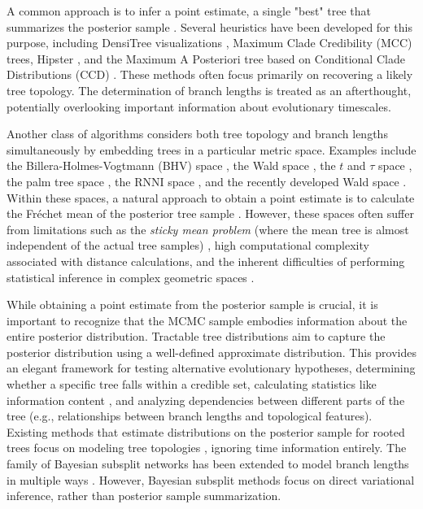 \documentclass[10pt,letterpaper]{article}
\begin{document}
A common approach is to infer a point estimate, a single "best" tree that summarizes the posterior sample \cite{treesinforest}. Several heuristics have been developed for this purpose, including DensiTree visualizations \cite{densitree}, Maximum Clade Credibility (MCC) trees, Hipster \cite{hipstr}, and the Maximum A Posteriori tree based on Conditional Clade Distributions (CCD) \cite{ccd,ccdlarget}. These methods often focus primarily on recovering a likely tree topology. The determination of branch lengths is treated as an afterthought, potentially overlooking important information about evolutionary timescales.

Another class of algorithms considers both tree topology and branch lengths simultaneously by embedding trees in a particular metric space. Examples include the Billera-Holmes-Vogtmann (BHV) space \cite{bhv}, the Wald space \cite{wald}, the $t$ and $\tau$ space \cite{tauspace}, the palm tree space \cite{tropical}, the RNNI space \cite{rnnispace}, and the recently developed Wald space \cite{wald}. Within these spaces, a natural approach to obtain a point estimate is to calculate the Fréchet mean of the posterior tree sample \cite{frechetmeanvar}. However, these spaces often suffer from limitations such as the \emph{sticky mean problem} (where the mean tree is almost independent of the actual tree samples) \cite{sticky}, high computational complexity associated with distance calculations, and the inherent difficulties of performing statistical inference in complex geometric spaces \cite{riemanngaussian}.

While obtaining a point estimate from the posterior sample is crucial, it is important to recognize that the MCMC sample embodies information about the entire posterior distribution. Tractable tree distributions \cite{ccd} aim to capture the posterior distribution using a well-defined approximate distribution. This provides an elegant framework for testing alternative evolutionary hypotheses, determining whether a specific tree falls within a credible set, calculating statistics like information content \cite{informationcontent}, and analyzing dependencies between different parts of the tree (e.g., relationships between branch lengths and topological features). Existing methods that estimate distributions on the posterior sample for rooted trees focus on modeling tree topologies \cite{ccd,ccdlarget}, ignoring time information entirely. The family of Bayesian subsplit networks \cite{subsplit} has been extended to model branch lengths in multiple ways \cite{subsplitnf,subsplitbranchlengths}. However, Bayesian subsplit methods focus on direct variational inference, rather than posterior sample summarization.
\end{document}
